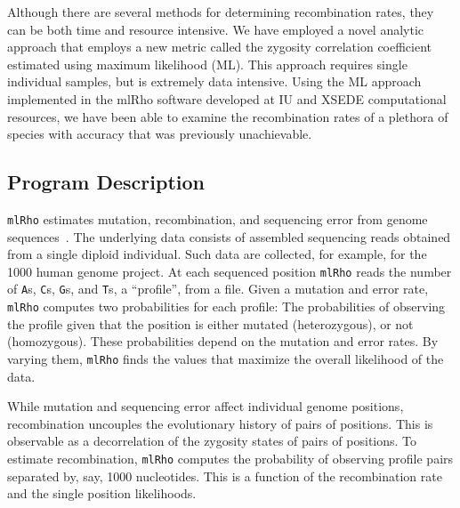 \documentclass{sig-alternate}
\newcommand{\ty}{\texttt}
\begin{document}
Although there are several methods for determining recombination rates, they can be both time and resource
intensive. We have employed a novel analytic approach that employs a new metric called the zygosity
correlation coefficient estimated using maximum likelihood (ML). This approach requires single individual
samples, but is extremely data intensive. Using the ML approach implemented in the mlRho software developed at
IU and XSEDE computational resources, we have been able to examine the recombination rates of a plethora of
species with accuracy that was previously unachievable.

\subsection{Program Description}
\texttt{mlRho} estimates mutation, recombination, and sequencing error from genome
sequences~\cite{hau10:mlr}. The underlying data consists of assembled sequencing reads obtained from a single
diploid individual. Such data are collected, for example, for the 1000 human genome project. At each sequenced
position \texttt{mlRho} reads the number of \ty{A}s, \ty{C}s, \ty{G}s, and \ty{T}s, a ``profile'', from a
file. Given a mutation and error rate, \ty{mlRho} computes two probabilities for each profile: The
probabilities of observing the profile given that the position is either mutated (heterozygous), or not
(homozygous). These probabilities depend on the mutation and error rates. By varying them, \ty{mlRho} finds
the values that maximize the overall likelihood of the data.

While mutation and sequencing error affect individual genome positions, recombination uncouples the
evolutionary history of pairs of positions. This is observable as a decorrelation of the zygosity states of
pairs of positions. To estimate recombination, \ty{mlRho} computes the probability of observing profile pairs
separated by, say, 1000 nucleotides. This is a function of the recombination rate and the single position
likelihoods.
\end{document}

